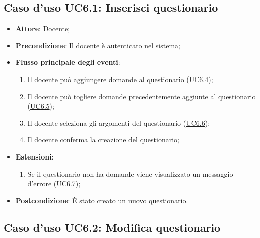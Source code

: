 \documentclass[12pt,a4paper]{article}
\begin{document}
\subsection{Caso d'uso UC6.1: Inserisci questionario}

\begin{itemize}

\item \textbf{Attore}: Docente; 
\item \textbf{Precondizione}: Il docente è autenticato nel sistema;

\item \textbf{Flusso principale degli eventi}:
\begin{enumerate}
	\item Il docente può aggiungere domande al questionario (\hyperlink{UC6.4}{UC6.4});
	\item Il docente può togliere domande precedentemente aggiunte al questionario (\hyperlink{UC6.5}{UC6.5});
	\item Il docente seleziona gli argomenti del questionario (\hyperlink{UC6.6}{UC6.6});
	\item Il docente conferma la creazione del questionario;
	
\end{enumerate}
\item \textbf{Estensioni}:
\begin{enumerate}
	\item Se il questionario non ha domande viene visualizzato un messaggio d'errore (\hyperlink{UC6.7}{UC6.7});
	
\end{enumerate}
\item \textbf{Postcondizione}: È stato creato un nuovo questionario.
\end{itemize}
\hypertarget{UC6.2}{}
\subsection{Caso d'uso UC6.2: Modifica questionario}
\end{document}
